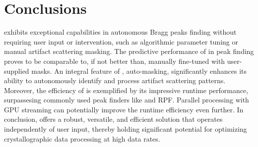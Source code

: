 \documentclass[a4paper]{article}
\begin{document}
\begin{table}[t]
\caption{
    The runtime performance of diffraction image analysis algorithms measured on
    Rayonix images containing 3.7 megapixels.  We measured runtime performance
    of \psocake{} and \peaknet{} directly using Rayonix images.  For reference
    purposes, we also included another peak finding method RPF
    \citep{hadian-jaziPeakfindingAlgorithmBased2017,
    hadian-jaziDataReductionSerial2021} and two classification methods for X-ray
    diffraction data reduction. RPF runtime performance was originally measured
    on AGIPD 1M \citep{allahgholiAdaptiveGainIntegrating2019}.  
}
\label{tb : runtime}
\centering
{}
\end{table}


\section{Conclusions}

\peaknet{} exhibits exceptional capabilities in autonomous Bragg peaks finding
without requiring user input or intervention, such as algorithmic parameter
tuning or manual artifact scattering masking.  The predictive performance of
\peaknet{} in peak finding proves to be comparable to, if not better than,
manually fine-tuned \psocake{} with user-supplied masks.  An integral feature of
\peaknet{}, auto-masking, significantly enhances its ability to autonomously
identify and process artifact scattering patterns.  Moreover, the efficiency of
\peaknet{} is exemplified by its impressive runtime performance, surpassesing
commonly used peak finders like \psocake{} and RPF.  Parallel processing with
GPU streaming can potentially improve the runtime efficiency even further.  In
conclusion, \peaknet{}  offers a robust, versatile, and efficient solution that
operates independently of user input, thereby holding significant potential for
optimizing crystallographic data processing at high data rates.



\end{document}
